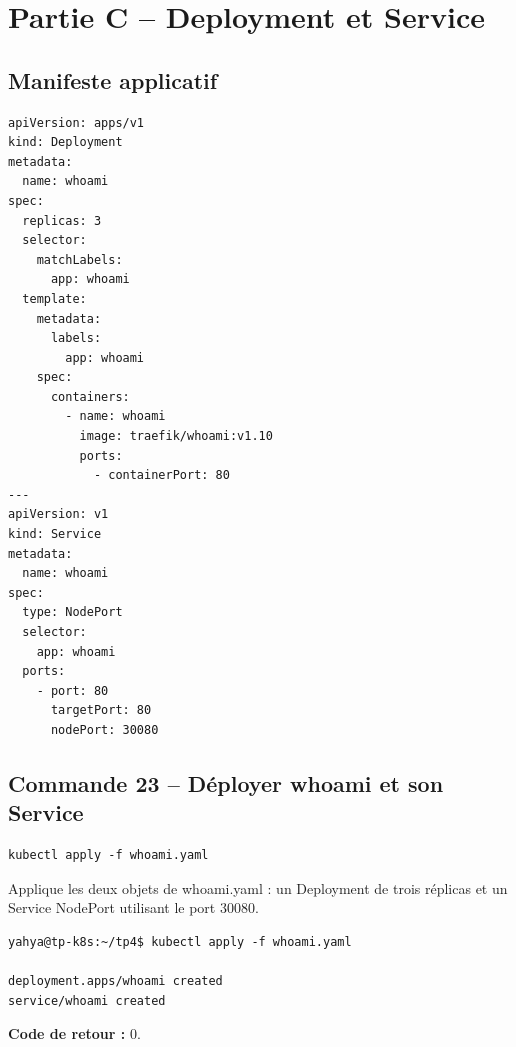 \documentclass[11pt,a4paper]{article}
\begin{document}
\clearpage
\section{Partie C -- Deployment et Service}
\subsection{Manifeste applicatif}
\begin{lstlisting}
apiVersion: apps/v1
kind: Deployment
metadata:
  name: whoami
spec:
  replicas: 3
  selector:
    matchLabels:
      app: whoami
  template:
    metadata:
      labels:
        app: whoami
    spec:
      containers:
        - name: whoami
          image: traefik/whoami:v1.10
          ports:
            - containerPort: 80
---
apiVersion: v1
kind: Service
metadata:
  name: whoami
spec:
  type: NodePort
  selector:
    app: whoami
  ports:
    - port: 80
      targetPort: 80
      nodePort: 30080
\end{lstlisting}

\subsection{Commande 23 -- Déployer whoami et son Service}
\begin{lstlisting}
kubectl apply -f whoami.yaml
\end{lstlisting}
Applique les deux objets de whoami.yaml : un Deployment de trois réplicas et un Service NodePort utilisant le port 30080.
\begin{tcolorbox}[terminal,title={Ubuntu / WSL2 -- Commande 23 -- rendu reconstitué}]
\begin{Verbatim}[fontsize=\scriptsize,breaklines=true,breakanywhere=true,breaksymbolleft={},breaksymbolright={}]
yahya@tp-k8s:~/tp4$ kubectl apply -f whoami.yaml

deployment.apps/whoami created
service/whoami created
\end{Verbatim}
\end{tcolorbox}
\textbf{Code de retour :} 0.
\end{document}
